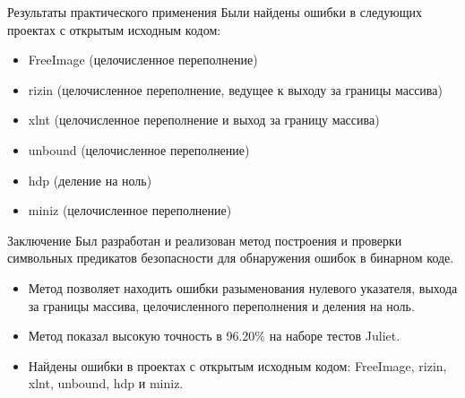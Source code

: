 \documentclass[10pt]{beamer}
\begin{document}
\begin{frame}{Результаты практического применения}
Были найдены ошибки в следующих проектах с открытым исходным кодом:
\begin{itemize}
    \item FreeImage (целочисленное переполнение)
    \item rizin (целочисленное переполнение, ведущее к выходу за границы
        массива)
    \item xlnt (целочисленное переполнение и выход за границу массива)
    \item unbound (целочисленное переполнение)
    \item hdp (деление на ноль)
    \item miniz (целочисленное переполнение)
\end{itemize}
\end{frame}

\begin{frame}{Заключение}
Был разработан и реализован метод построения и проверки символьных
предикатов безопасности для обнаружения ошибок в бинарном коде.
\begin{itemize}
    \item Метод позволяет находить ошибки разыменования нулевого указателя,
        выхода за границы массива, целочисленного переполнения и деления на
        ноль.
    \item Метод показал высокую
        точность в 96.20\% на наборе тестов Juliet.
    \item Найдены ошибки в проектах с открытым исходным кодом:
        FreeImage, rizin, xlnt, unbound, hdp и miniz.
\end{itemize}
\end{frame}
\end{document}
